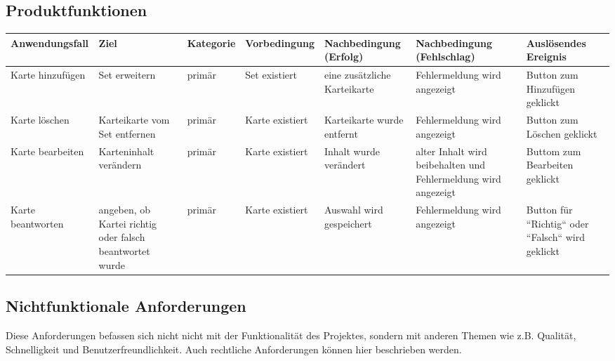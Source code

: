 \begin{landscape}
\begin{center}
\subsection{Produktfunktionen}


\begin{tabulary}{1.35\textwidth}{|L|L|L|L|L|L|L|}
\hline 
\textbf{Anwendungsfall} & \textbf{Ziel} & \textbf{Kategorie} & \textbf{Vorbedingung} & \textbf{Nachbedingung (Erfolg)} & \textbf{Nachbedingung (Fehlschlag)} & \textbf{Auslösendes Ereignis} \\ 
\hline 
Karte hinzufügen & Set erweitern & primär & Set existiert & eine zusätzliche Karteikarte & Fehlermeldung wird angezeigt & Button zum Hinzufügen geklickt \\ 
\hline 
Karte löschen & Karteikarte vom Set entfernen & primär & Karte existiert & Karteikarte wurde entfernt & Fehlermeldung wird angezeigt & Button zum Löschen geklickt \\ 
\hline 
Karte bearbeiten & Karteninhalt verändern & primär & Karte existiert & Inhalt wurde verändert & alter Inhalt wird beibehalten und Fehlermeldung wird angezeigt & Buttom zum Bearbeiten geklickt \\ 
\hline 
Karte beantworten & angeben, ob Kartei richtig oder falsch beantwortet wurde & primär & Karte existiert & Auswahl wird gespeichert & Fehlermeldung wird angezeigt & Button für ``Richtig`` oder ``Falsch`` wird geklickt \\ 
\hline 
\end{tabulary} 
\end{center}
\end{landscape}
\restoregeometry


\newpage
\subsection{Nichtfunktionale Anforderungen}
Diese Anforderungen befassen sich nicht nicht mit der Funktionalität des Projektes, sondern mit anderen Themen wie z.B. Qualität, Schnelligkeit und Benutzerfreundlichkeit. Auch rechtliche Anforderungen können hier beschrieben werden.

